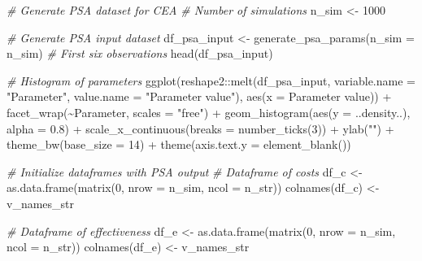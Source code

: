 \documentclass[
]{article}
\newenvironment{Shaded}{\begin{snugshade}}{\end{snugshade}}
\newcommand{\AttributeTok}[1]{\textcolor[rgb]{0.77,0.63,0.00}{#1}}
\newcommand{\CommentTok}[1]{\textcolor[rgb]{0.56,0.35,0.01}{\textit{#1}}}
\newcommand{\DecValTok}[1]{\textcolor[rgb]{0.00,0.00,0.81}{#1}}
\newcommand{\FloatTok}[1]{\textcolor[rgb]{0.00,0.00,0.81}{#1}}
\newcommand{\FunctionTok}[1]{\textcolor[rgb]{0.00,0.00,0.00}{#1}}
\newcommand{\NormalTok}[1]{#1}
\newcommand{\OtherTok}[1]{\textcolor[rgb]{0.56,0.35,0.01}{#1}}
\newcommand{\SpecialCharTok}[1]{\textcolor[rgb]{0.00,0.00,0.00}{#1}}
\newcommand{\StringTok}[1]{\textcolor[rgb]{0.31,0.60,0.02}{#1}}
\begin{document}
\begin{Shaded}
\begin{Highlighting}[]
\CommentTok{\# Generate PSA dataset for CEA}
\CommentTok{\# Number of simulations}
\NormalTok{n\_sim }\OtherTok{\textless{}{-}} \DecValTok{1000}

\CommentTok{\# Generate PSA input dataset}
\NormalTok{df\_psa\_input }\OtherTok{\textless{}{-}} \FunctionTok{generate\_psa\_params}\NormalTok{(}\AttributeTok{n\_sim =}\NormalTok{ n\_sim)}
\CommentTok{\# First six observations}
\FunctionTok{head}\NormalTok{(df\_psa\_input)}

\CommentTok{\# Histogram of parameters}
\FunctionTok{ggplot}\NormalTok{(reshape2}\SpecialCharTok{::}\FunctionTok{melt}\NormalTok{(df\_psa\_input, }\AttributeTok{variable.name =} \StringTok{"Parameter"}\NormalTok{, }
                      \AttributeTok{value.name =} \StringTok{"Parameter value"}\NormalTok{), }
                      \FunctionTok{aes}\NormalTok{(}\AttributeTok{x =} \StringTok{\textasciigrave{}}\AttributeTok{Parameter value}\StringTok{\textasciigrave{}}\NormalTok{)) }\SpecialCharTok{+}
                      \FunctionTok{facet\_wrap}\NormalTok{(}\SpecialCharTok{\textasciitilde{}}\NormalTok{Parameter, }\AttributeTok{scales =} \StringTok{"free"}\NormalTok{) }\SpecialCharTok{+}
                      \FunctionTok{geom\_histogram}\NormalTok{(}\FunctionTok{aes}\NormalTok{(}\AttributeTok{y =}\NormalTok{ ..density..), }\AttributeTok{alpha =} \FloatTok{0.8}\NormalTok{) }\SpecialCharTok{+}
                      \FunctionTok{scale\_x\_continuous}\NormalTok{(}\AttributeTok{breaks =} \FunctionTok{number\_ticks}\NormalTok{(}\DecValTok{3}\NormalTok{)) }\SpecialCharTok{+}
                      \FunctionTok{ylab}\NormalTok{(}\StringTok{""}\NormalTok{) }\SpecialCharTok{+}
                      \FunctionTok{theme\_bw}\NormalTok{(}\AttributeTok{base\_size =} \DecValTok{14}\NormalTok{) }\SpecialCharTok{+}
                      \FunctionTok{theme}\NormalTok{(}\AttributeTok{axis.text.y =} \FunctionTok{element\_blank}\NormalTok{())                    }

\CommentTok{\# Initialize dataframes with PSA output }
\CommentTok{\# Dataframe of costs}
\NormalTok{df\_c }\OtherTok{\textless{}{-}} \FunctionTok{as.data.frame}\NormalTok{(}\FunctionTok{matrix}\NormalTok{(}\DecValTok{0}\NormalTok{, }
                      \AttributeTok{nrow =}\NormalTok{ n\_sim,}
                      \AttributeTok{ncol =}\NormalTok{ n\_str))}
\FunctionTok{colnames}\NormalTok{(df\_c) }\OtherTok{\textless{}{-}}\NormalTok{ v\_names\_str}

\CommentTok{\# Dataframe of effectiveness}
\NormalTok{df\_e }\OtherTok{\textless{}{-}} \FunctionTok{as.data.frame}\NormalTok{(}\FunctionTok{matrix}\NormalTok{(}\DecValTok{0}\NormalTok{, }
                      \AttributeTok{nrow =}\NormalTok{ n\_sim,}
                      \AttributeTok{ncol =}\NormalTok{ n\_str))}
\FunctionTok{colnames}\NormalTok{(df\_e) }\OtherTok{\textless{}{-}}\NormalTok{ v\_names\_str}
\end{Highlighting}
\end{Shaded}
\end{document}
